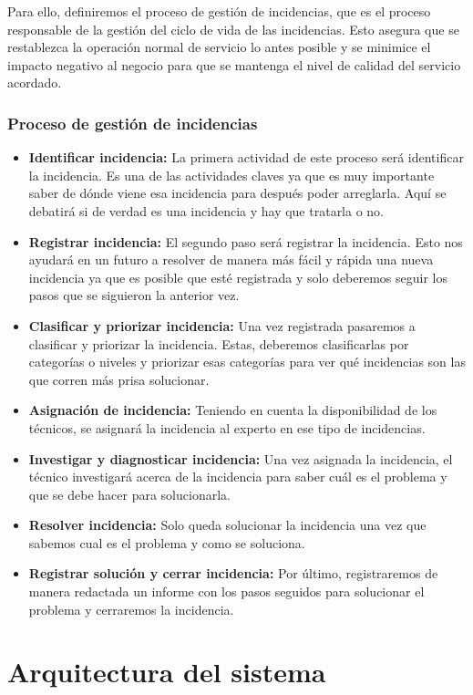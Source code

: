 Para ello, definiremos el proceso de gestión de incidencias, que es el
proceso responsable de la gestión del ciclo de vida de las
incidencias. Esto asegura que se restablezca la operación normal de
servicio lo antes posible y se minimice el impacto negativo al negocio
para que se mantenga el nivel de calidad del servicio acordado.
\subsubsection{Proceso de gestión de incidencias}
\begin{itemize}
\item{\textbf{Identificar incidencia:}} La primera actividad de este
  proceso será identificar la incidencia. Es una de las actividades
  claves ya que es muy importante saber de dónde viene esa incidencia
  para después poder arreglarla. Aquí se debatirá si de verdad es una
  incidencia y hay que tratarla o no.
\item {\textbf{Registrar incidencia:}} El segundo paso será registrar
  la incidencia. Esto nos ayudará en un futuro a resolver de manera
  más fácil y rápida una nueva incidencia ya que es posible que esté
  registrada y solo deberemos seguir los pasos que se siguieron la
  anterior vez.
\item{\textbf{Clasificar y priorizar incidencia:}} Una vez registrada
  pasaremos a clasificar y priorizar la incidencia. Estas, deberemos
  clasificarlas por categorías o niveles y priorizar esas categorías
  para ver qué incidencias son las que corren más prisa solucionar.
\item{\textbf{Asignación de incidencia:}} Teniendo en cuenta la
  disponibilidad de los técnicos, se asignará la incidencia al experto
  en ese tipo de incidencias.
\item{\textbf{Investigar y diagnosticar incidencia:}} Una vez asignada
  la incidencia, el técnico investigará acerca de la incidencia para
  saber cuál es el problema y que se debe hacer para solucionarla.
\item{\textbf{Resolver incidencia:}} Solo queda solucionar la
  incidencia una vez que sabemos cual es el problema y como se
  soluciona.
\item{\textbf{Registrar solución y cerrar incidencia:}} Por último,
  registraremos de manera redactada un informe con los pasos seguidos
  para solucionar el problema y cerraremos la incidencia.
\end{itemize}
\section{Arquitectura del sistema}
